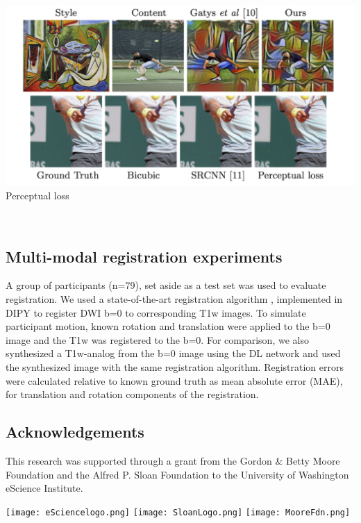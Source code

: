 \documentclass[a0, portrait]{a0poster}
\begin{document}
\begin{multicols}{2}
\begin{minipage}[b]{\linewidth}
    \includegraphics[width=0.8\linewidth]{perceptual-loss.png}
    \center Perceptual loss
    \end{minipage}
    \\

\subsection*{Multi-modal registration experiments}
A group of participants (n=79), set aside as a test set was used to
evaluate registration. We used a state-of-the-art registration algorithm
\cite{Avants2008-sa}, implemented in DIPY \cite{Garyfallidis2014-el} to
register DWI b=0 to corresponding T1w images. To simulate participant
motion, known rotation and translation were applied to the b=0 image and
the T1w was registered to the b=0. For comparison, we also synthesized a
T1w-analog from the b=0 image using the DL network and used the
synthesized image with the same registration algorithm. Registration
errors were calculated relative to known ground truth as mean absolute
error (MAE), for translation and rotation components of the registration.

\subsection*{Acknowledgements} \footnotesize This research was supported through
a grant from the Gordon \& Betty Moore Foundation and the Alfred P. Sloan
Foundation to the University of Washington eScience Institute.

\texttt{[image: eSciencelogo.png]}
\texttt{[image: SloanLogo.png]}
\texttt{[image: MooreFdn.png]}

\columnbreak


\end{multicols}
\end{document}
